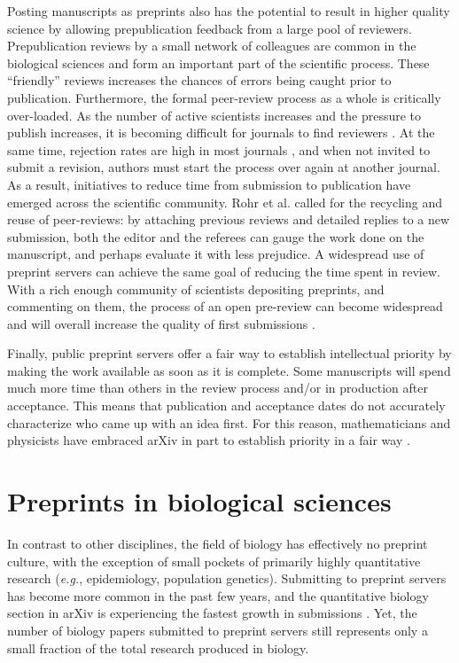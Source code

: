 \documentclass[10pt]{article}
\begin{document}
Posting manuscripts as preprints also has the potential to result in higher
quality science by allowing prepublication feedback from a large pool of
reviewers. Prepublication reviews by a small network of colleagues are common in
the biological sciences and form an important part of the scientific process.
These ``friendly'' reviews increases the chances of errors being caught prior to
publication. Furthermore, the formal peer-review process as a whole is
critically over-loaded. As the number of active scientists increases and the
pressure to publish increases, it is becoming difficult for journals
to find reviewers \cite{hoc09}.  At the same time, rejection rates are high in
most journals \cite{aar08,roh09}, and when not invited to submit a revision,
authors must start the process over again at another journal. As a result,
initiatives to reduce time from submission to publication have emerged across
the scientific community. Rohr et al.  \cite{roh09} called for the recycling and
reuse of peer-reviews: by attaching previous reviews and detailed replies to a
new submission, both the editor and the referees can gauge the work done on the
manuscript, and perhaps evaluate it with less prejudice. A widespread use of
preprint servers can achieve the same goal of reducing the time spent in review.
With a rich enough community of scientists depositing preprints, and commenting
on them, the process of an open pre-review can become widespread and will
overall increase the quality of first submissions \cite{hoc12}.

Finally, public preprint servers offer a fair way to establish intellectual
priority by making the work available as soon as it is complete. Some
manuscripts will spend much more time than others in the review process and/or in
production after acceptance. This means that publication and
acceptance dates do not accurately characterize who came up with an idea
first. For this reason, mathematicians and physicists have embraced arXiv in
part to establish priority in a fair way \cite{gin11,cal12}.

\section*{Preprints in biological sciences}

In contrast to other disciplines, the field of biology has effectively no
preprint culture, with the exception of small pockets of primarily highly
quantitative research (\emph{e.g.}, epidemiology, population genetics).
Submitting to preprint servers has become more common in the past few years,
and the quantitative biology section in arXiv is experiencing the fastest
growth in submissions \cite{cal12}. Yet, the number of biology papers
submitted to preprint servers still represents only a small fraction of the
total research produced in biology.
\end{document}
